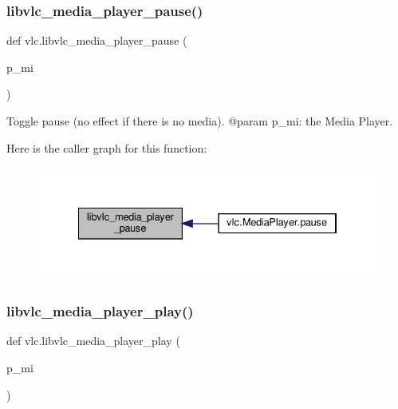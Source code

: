 \subsubsection{\texorpdfstring{libvlc\+\_\+media\+\_\+player\+\_\+pause()}{libvlc\_media\_player\_pause()}}
{\footnotesize\ttfamily def vlc.\+libvlc\+\_\+media\+\_\+player\+\_\+pause (\begin{DoxyParamCaption}\item[{}]{p\+\_\+mi }\end{DoxyParamCaption})}

\begin{DoxyVerb}Toggle pause (no effect if there is no media).
@param p_mi: the Media Player.
\end{DoxyVerb}
 Here is the caller graph for this function\+:
\nopagebreak
\begin{figure}[H]
\begin{center}
\leavevmode
\includegraphics[width=334pt]{namespacevlc_a14e54bf8f28013d3b04df6b07a717fba_icgraph}
\end{center}
\end{figure}
\mbox{\label{namespacevlc_a17af4b7be817987cbc47625092cb49f3}} 
\subsubsection{\texorpdfstring{libvlc\+\_\+media\+\_\+player\+\_\+play()}{libvlc\_media\_player\_play()}}
{\footnotesize\ttfamily def vlc.\+libvlc\+\_\+media\+\_\+player\+\_\+play (\begin{DoxyParamCaption}\item[{}]{p\+\_\+mi }\end{DoxyParamCaption})}

